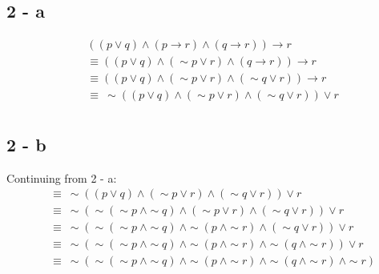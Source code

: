 \documentclass[12pt]{article}
\begin{document}
\subsection*{2 - a}
\begin{align*}
  &((p \vee q) \wedge (p \rightarrow r) \wedge (q \rightarrow r)) \rightarrow r \\
  &\equiv ((p \vee q) \wedge (\sim p \vee r) \wedge (q \rightarrow r)) \rightarrow r \\
  &\equiv ((p \vee q) \wedge (\sim p \vee r) \wedge (\sim q \vee r)) \rightarrow r \\
  &\equiv \ \sim ((p \vee q) \wedge (\sim p \vee r) \wedge (\sim q \vee r)) \vee r \\
\end{align*}
\subsection*{2 - b}
Continuing from 2 - a:
\begin{align*}
  &\equiv \ \sim ((p \vee q) \wedge (\sim p \vee r) \wedge (\sim q \vee r)) \vee r \\
  &\equiv \ \sim (\sim(\sim p \ \wedge \sim q) \wedge (\sim p \vee r) \wedge (\sim q \vee r)) \vee r \\
  &\equiv \ \sim (\sim(\sim p \ \wedge \sim q) \ \wedge \sim (p \ \wedge \sim r) \wedge (\sim q \vee r)) \vee r \\
  &\equiv \ \sim (\sim(\sim p \ \wedge \sim q) \ \wedge \sim (p \ \wedge \sim r) \ \wedge \sim (q \ \wedge \sim r)) \vee r \\
  &\equiv \ \sim (\sim(\sim p \ \wedge \sim q) \ \wedge \sim (p \ \wedge \sim r) \ \wedge \sim (q \ \wedge \sim r) \ \wedge \sim r) \\
\end{align*}
\end{document}
